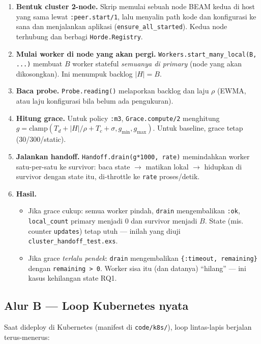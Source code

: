 \documentclass[11pt]{article}
\newcommand{\code}[1]{\texttt{\small #1}}
\begin{document}
\begin{enumerate}
  \item \textbf{Bentuk cluster 2-node.} Skrip memulai sebuah node BEAM kedua di host yang sama lewat
  \code{:peer.start/1}, lalu menyalin path kode dan konfigurasi ke sana dan menjalankan aplikasi
  (\code{ensure\_all\_started}). Kedua node terhubung dan berbagi \code{Horde.Registry}.
  \item \textbf{Mulai worker di node yang akan pergi.} \code{Workers.start\_many\_local(B, ...)}
  membuat $B$ worker stateful \emph{semuanya di primary} (node yang akan dikosongkan). Ini menumpuk
  backlog $|H| = B$.
  \item \textbf{Baca probe.} \code{Probe.reading()} melaporkan backlog dan laju $\rho$ (EWMA, atau laju
  konfigurasi bila belum ada pengukuran).
  \item \textbf{Hitung grace.} Untuk policy \code{:m3}, \code{Grace.compute/2} menghitung
  $g = \mathrm{clamp}(T_d + |H|/\rho + T_c + \sigma, g_{\min}, g_{\max})$. Untuk baseline, grace tetap
  (30/300/static).
  \item \textbf{Jalankan handoff.} \code{Handoff.drain(g*1000, rate)} memindahkan worker satu-per-satu
  ke survivor: baca state $\rightarrow$ matikan lokal $\rightarrow$ hidupkan di survivor dengan state
  itu, di-throttle ke \code{rate} proses/detik.
  \item \textbf{Hasil.}
  \begin{itemize}
    \item Jika grace cukup: semua worker pindah, \code{drain} mengembalikan \code{:ok},
    \code{local\_count} primary menjadi 0 dan survivor menjadi $B$. State (mis. counter
    \code{updates}) tetap utuh --- inilah yang diuji \code{cluster\_handoff\_test.exs}.
    \item Jika grace \emph{terlalu pendek}: \code{drain} mengembalikan \code{\{:timeout, remaining\}}
    dengan \code{remaining > 0}. Worker sisa itu (dan datanya) ``hilang'' --- ini kasus kehilangan
    state RQ1.
  \end{itemize}
\end{enumerate}

\subsection{Alur B --- Loop Kubernetes nyata}
Saat dideploy di Kubernetes (manifest di \code{code/k8s/}), loop lintas-lapis berjalan terus-menerus:
\end{document}
